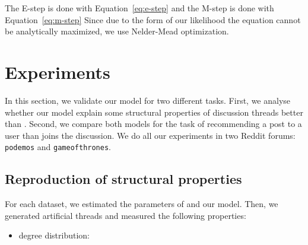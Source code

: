 \documentclass[smallextended]{svjour3}          %
\begin{document}
The E-step is done with Equation~\ref{eq:e-step} and the M-step is done with Equation~\ref{eq:m-step} Since due to the form of our likelihood the equation cannot be analytically maximized, we use Nelder-Mead optimization.
\section{Experiments}
In this section, we validate our model for two different tasks. First, we analyse whether our model explain some structural properties of discussion threads better than \cite{Gomez2012}. Second, we compare both models for the task of recommending a post to a user than joins the discussion. We do all our experiments in two Reddit forums: \texttt{podemos} and \texttt{gameofthrones}.

\subsection{Reproduction of structural properties} 
For each dataset, we estimated the parameters of \citep{Gomez2012} and our model. Then, we generated artificial threads and measured the following properties:

\begin{itemize}
\item degree distribution:
\end{itemize} 
\end{document}
